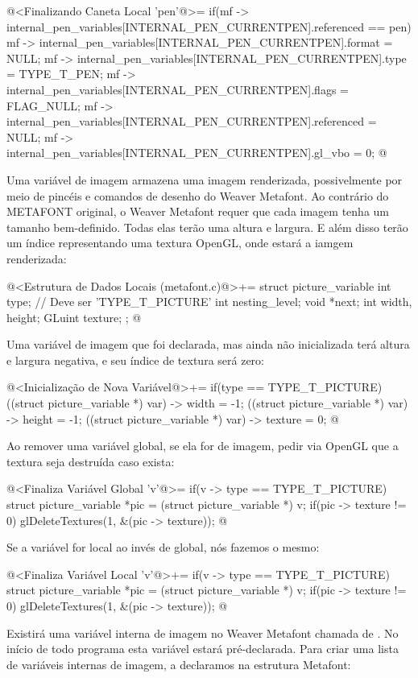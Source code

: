 \iniciocodigo
@<Finalizando Caneta Local 'pen'@>=
if(mf -> internal_pen_variables[INTERNAL_PEN_CURRENTPEN].referenced == pen){
  mf -> internal_pen_variables[INTERNAL_PEN_CURRENTPEN].format = NULL;
  mf -> internal_pen_variables[INTERNAL_PEN_CURRENTPEN].type = TYPE_T_PEN;
  mf -> internal_pen_variables[INTERNAL_PEN_CURRENTPEN].flags = FLAG_NULL;
  mf -> internal_pen_variables[INTERNAL_PEN_CURRENTPEN].referenced = NULL;
  mf -> internal_pen_variables[INTERNAL_PEN_CURRENTPEN].gl_vbo = 0;
}
@
\fimcodigo


Uma variável de imagem armazena uma imagem renderizada, possivelmente
por meio de pincéis e comandos de desenho do Weaver Metafont. Ao
contrário do METAFONT original, o Weaver Metafont requer que cada
imagem tenha um tamanho bem-definido. Todas elas terão uma altura e
largura. E além disso terão um índice representando uma textura
OpenGL, onde estará a iamgem renderizada:

\iniciocodigo
@<Estrutura de Dados Locais (metafont.c)@>+=
struct picture_variable{
  int type; // Deve ser 'TYPE_T_PICTURE'
  int nesting_level;
  void *next;
  int width, height;
  GLuint texture;
};
@
\fimcodigo

Uma variável de imagem que foi declarada, mas ainda não inicializada
terá altura e largura negativa, e seu índice de textura será zero:

\iniciocodigo
@<Inicialização de Nova Variável@>+=
if(type == TYPE_T_PICTURE){
  ((struct picture_variable *) var) -> width = -1;
  ((struct picture_variable *) var) -> height = -1;
  ((struct picture_variable *) var) -> texture = 0;
}
@
\fimcodigo

Ao remover uma variável global, se ela for de imagem, pedir via OpenGL
que a textura seja destruída caso exista:

\iniciocodigo
@<Finaliza Variável Global 'v'@>=
if(v -> type == TYPE_T_PICTURE){
  struct picture_variable *pic = (struct picture_variable *) v;
  if(pic -> texture != 0)
    glDeleteTextures(1, &(pic -> texture));
}
@
\fimcodigo

Se a variável for local ao invés de global, nós fazemos o mesmo:

\iniciocodigo
@<Finaliza Variável Local 'v'@>+=
if(v -> type == TYPE_T_PICTURE){
  struct picture_variable *pic = (struct picture_variable *) v;
  if(pic -> texture != 0)
    glDeleteTextures(1, &(pic -> texture));
}
@
\fimcodigo

Existirá uma variável interna de imagem no Weaver Metafont chamada
de . No início de todo programa esta
variável estará pré-declarada. Para criar uma lista de variáveis
internas de imagem, a declaramos na estrutura Metafont:

